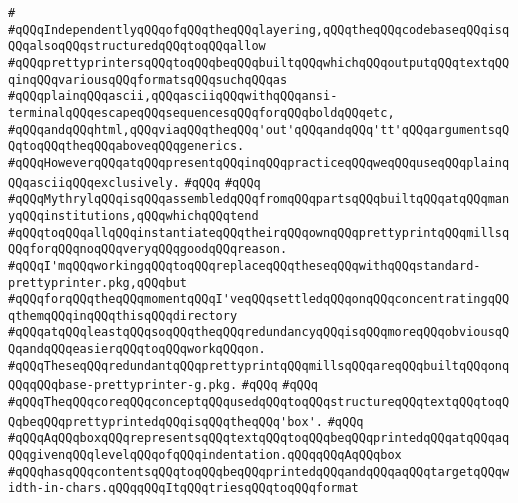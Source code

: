 \verb|#|\newline
\verb|#qQQqIndependentlyqQQqofqQQqtheqQQqlayering,qQQqtheqQQqcodebaseqQQqisqQQqalsoqQQqstructuredqQQqtoqQQqallow|\newline
\verb|#qQQqprettyprintersqQQqtoqQQqbeqQQqbuiltqQQqwhichqQQqoutputqQQqtextqQQqinqQQqvariousqQQqformatsqQQqsuchqQQqas|\newline
\verb|#qQQqplainqQQqascii,qQQqasciiqQQqwithqQQqansi-terminalqQQqescapeqQQqsequencesqQQqforqQQqboldqQQqetc,|\newline
\verb|#qQQqandqQQqhtml,qQQqviaqQQqtheqQQq'out'qQQqandqQQq'tt'qQQqargumentsqQQqtoqQQqtheqQQqaboveqQQqgenerics.|\newline
\verb|#qQQqHoweverqQQqatqQQqpresentqQQqinqQQqpracticeqQQqweqQQquseqQQqplainqQQqasciiqQQqexclusively.|\newline
\verb|#qQQq|\newline
\verb|#qQQq|\newline
\verb|#qQQqMythrylqQQqisqQQqassembledqQQqfromqQQqpartsqQQqbuiltqQQqatqQQqmanyqQQqinstitutions,qQQqwhichqQQqtend|\newline
\verb|#qQQqtoqQQqallqQQqinstantiateqQQqtheirqQQqownqQQqprettyprintqQQqmillsqQQqforqQQqnoqQQqveryqQQqgoodqQQqreason.|\newline
\verb|#qQQqI'mqQQqworkingqQQqtoqQQqreplaceqQQqtheseqQQqwithqQQqstandard-prettyprinter.pkg,qQQqbut|\newline
\verb|#qQQqforqQQqtheqQQqmomentqQQqI'veqQQqsettledqQQqonqQQqconcentratingqQQqthemqQQqinqQQqthisqQQqdirectory|\newline
\verb|#qQQqatqQQqleastqQQqsoqQQqtheqQQqredundancyqQQqisqQQqmoreqQQqobviousqQQqandqQQqeasierqQQqtoqQQqworkqQQqon.|\newline
\verb|#qQQqTheseqQQqredundantqQQqprettyprintqQQqmillsqQQqareqQQqbuiltqQQqonqQQqqQQqbase-prettyprinter-g.pkg.|\newline
\verb|#qQQq|\newline
\verb|#qQQq|\newline
\verb|#qQQqTheqQQqcoreqQQqconceptqQQqusedqQQqtoqQQqstructureqQQqtextqQQqtoqQQqbeqQQqprettyprintedqQQqisqQQqtheqQQq'box'.|\newline
\verb|#qQQq|\newline
\verb|#qQQqAqQQqboxqQQqrepresentsqQQqtextqQQqtoqQQqbeqQQqprintedqQQqatqQQqaqQQqgivenqQQqlevelqQQqofqQQqindentation.qQQqqQQqAqQQqbox|\newline
\verb|#qQQqhasqQQqcontentsqQQqtoqQQqbeqQQqprintedqQQqandqQQqaqQQqtargetqQQqwidth-in-chars.qQQqqQQqItqQQqtriesqQQqtoqQQqformat|\newline
